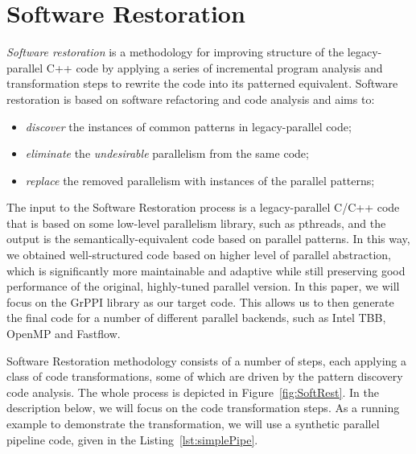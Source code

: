 \section{Software Restoration}

\noindent
\emph{Software restoration} is a methodology %
for improving structure of the legacy-parallel C++ code by applying a series of incremental program analysis and transformation steps to rewrite the code into its patterned equivalent. %
Software restoration is based on software refactoring and code analysis and aims to:
\begin{itemize}
\item \emph{discover} the instances of common patterns in legacy-parallel code;
\item \emph{eliminate} the \emph{undesirable} parallelism from the same code;
\item \emph{replace} the removed parallelism with instances of the parallel patterns;
\end{itemize}
\noindent
The input to the Software Restoration process is a legacy-parallel C/C++ code that is based on some low-level parallelism library, such as pthreads, and the output is the semantically-equivalent code based on parallel patterns. In this way, we obtained well-structured code based on higher level of parallel abstraction, which is significantly more maintainable and adaptive while still preserving
good performance of the original, highly-tuned parallel version. In this paper, we will focus on the GrPPI library as our target code. This allows us to then generate the final code for a number of different parallel backends, such as Intel TBB, OpenMP and Fastflow.

Software Restoration methodology consists of a number of steps, each applying a class of code transformations, some of which are driven by the pattern discovery code analysis.  The whole process is depicted in Figure~\ref{fig:SoftRest}. In the description below, we will focus on the code transformation steps. As a running example to demonstrate the transformation, we will use a synthetic parallel pipeline code, given in the Listing~\ref{lst:simplePipe}.


